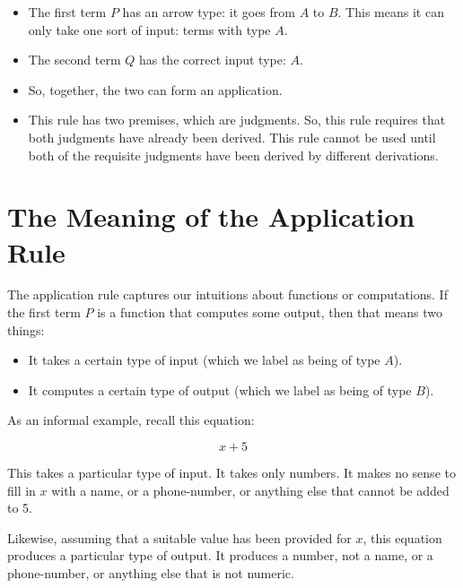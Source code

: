 \documentclass{book}
\numberwithin{equation}{chapter}
\begin{document}
\begin{itemize}

\item{The first term $P$ has an arrow type: it goes from $A$ to $B$. This means it can only take one sort of input: terms with type $A$.}

\item{The second term $Q$ has the correct input type: $A$.}

\item{So, together, the two can form an application.}

\item{This rule has two premises, which are judgments. So, this rule requires that both judgments have already been derived. This rule cannot be used until both of the requisite judgments have been derived by different derivations.}

\end{itemize}



\section{The Meaning of the Application Rule}

The application rule captures our intuitions about functions or computations. If the first term $P$ is a function that computes some output, then that means two things:

\begin{itemize}
\item{It takes a certain type of input (which we label as being of type $A$).}
\item{It computes a certain type of output (which we label as being of type $B$).}
\end{itemize}

\noindent
As an informal example, recall this equation:

\begin{equation}
x + 5
\end{equation}

\noindent
This takes a particular type of input. It takes only numbers. It makes no sense to fill in $x$ with a name, or a phone-number, or anything else that cannot be added to 5.

Likewise, assuming that a suitable value has been provided for $x$, this equation produces a particular type of output. It produces a number, not a name, or a phone-number, or anything else that is not numeric.
\end{document}
